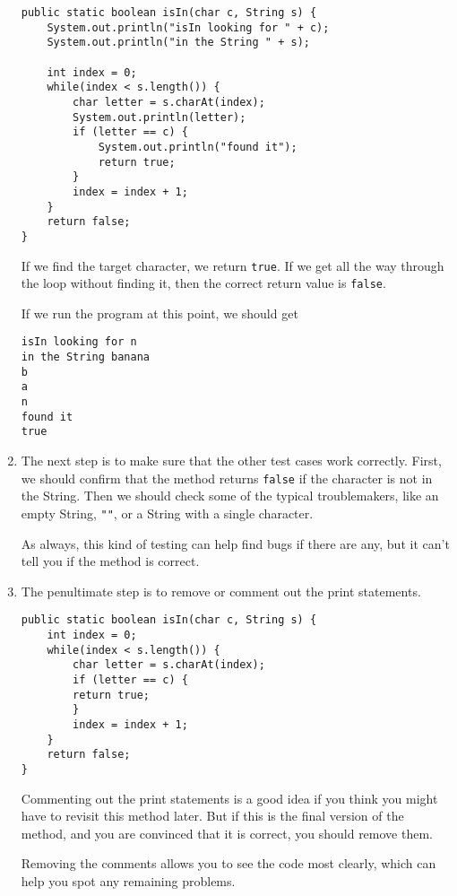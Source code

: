 \documentclass{book}
\begin{document}
\begin{enumerate}
\begin{verbatim}
public static boolean isIn(char c, String s) {
    System.out.println("isIn looking for " + c);
    System.out.println("in the String " + s);

    int index = 0;
    while(index < s.length()) {
        char letter = s.charAt(index);
        System.out.println(letter);
        if (letter == c) {
            System.out.println("found it");
            return true;
        }
        index = index + 1;
    }
    return false;
}
\end{verbatim}

If we find the target character, we return {\tt true}.
If we get all the way through the loop without finding it, then
the correct return value is {\tt false}.

If we run the program at this point, we should get

\begin{verbatim}
isIn looking for n
in the String banana
b
a
n
found it
true
\end{verbatim}


\item The next step is to make sure that the other test cases
work correctly.  First, we should confirm that the method returns
{\tt false} if the character is not in the String.
Then we should check some of the typical troublemakers, like
an empty String, {\tt ""}, or a String with a single character.

As always, this kind of testing can help find bugs if there
are any, but it can't tell you if the method is correct.

\item The penultimate step is to remove or comment out the print
statements.

\begin{verbatim}
public static boolean isIn(char c, String s) {
    int index = 0;
    while(index < s.length()) {
        char letter = s.charAt(index);
        if (letter == c) {
	    return true;
        }
        index = index + 1;
    }
    return false;
}
\end{verbatim}

Commenting out the print statements is a good idea if you
think you might have to revisit this method later.  But if
this is the final version of the method, and you are convinced
that it is correct, you should remove them.

Removing the comments allows you to see the code most clearly,
which can help you spot any remaining problems.


\end{enumerate}
\end{document}
